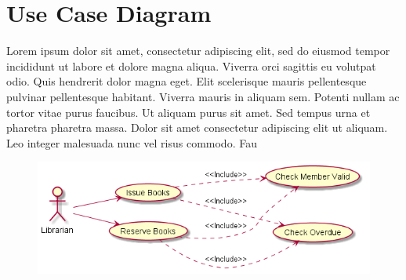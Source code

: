 \section{Use Case Diagram}\label{sec:uc}

Lorem ipsum dolor sit amet, consectetur adipiscing elit, sed do eiusmod tempor incididunt ut labore et dolore magna aliqua. Viverra orci sagittis eu volutpat odio. Quis hendrerit dolor magna eget. Elit scelerisque mauris pellentesque pulvinar pellentesque habitant. Viverra mauris in aliquam sem. Potenti nullam ac tortor vitae purus faucibus. Ut aliquam purus sit amet. Sed tempus urna et pharetra pharetra massa. Dolor sit amet consectetur adipiscing elit ut aliquam. Leo integer malesuada nunc vel risus commodo. Fau


  \begin{figure}[ht]
  \centering
  \includegraphics[width=1.1\textwidth]{./imatges/usecase.png}
  \label{fig:usecase}
   \end{figure}
